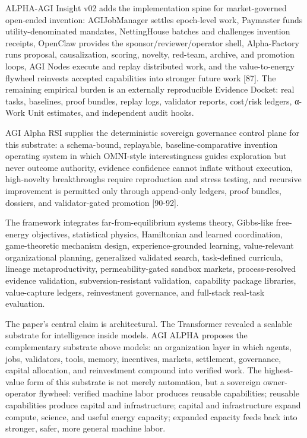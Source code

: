 ALPHA-AGI Insight v02 adds the implementation spine for market-governed
open-ended invention: AGIJobManager settles epoch-level work, Paymaster
funds utility-denominated mandates, NettingHouse batches and challenges
invention receipts, OpenClaw provides the sponsor/reviewer/operator
shell, Alpha-Factory runs proposal, causalization, scoring, novelty,
red-team, archive, and promotion loops, AGI Nodes execute and replay
distributed work, and the value-to-energy flywheel reinvests accepted
capabilities into stronger future work {[}87{]}. The remaining empirical
burden is an externally reproducible Evidence Docket: real tasks,
baselines, proof bundles, replay logs, validator reports, cost/risk
ledgers, α-Work Unit estimates, and independent audit hooks.

AGI Alpha RSI supplies the deterministic sovereign governance control
plane for this substrate: a schema-bound, replayable,
baseline-comparative invention operating system in which OMNI-style
interestingness guides exploration but never outcome authority, evidence
confidence cannot inflate without execution, high-novelty breakthroughs
require reproduction and stress testing, and recursive improvement is
permitted only through append-only ledgers, proof bundles, dossiers, and
validator-gated promotion {[}90-92{]}.

The framework integrates far-from-equilibrium systems theory, Gibbs-like
free-energy objectives, statistical physics, Hamiltonian and learned
coordination, game-theoretic mechanism design, experience-grounded
learning, value-relevant organizational planning, generalized validated
search, task-defined curricula, lineage metaproductivity,
permeability-gated sandbox markets, process-resolved evidence
validation, subversion-resistant validation, capability package
libraries, value-capture ledgers, reinvestment governance, and
full-stack real-task evaluation.

The paper's central claim is architectural. The Transformer revealed a
scalable substrate for intelligence inside models. AGI ALPHA proposes
the complementary substrate above models: an organization layer in which
agents, jobs, validators, tools, memory, incentives, markets,
settlement, governance, capital allocation, and reinvestment compound
into verified work. The highest-value form of this substrate is not
merely automation, but a sovereign owner-operator flywheel: verified
machine labor produces reusable capabilities; reusable capabilities
produce capital and infrastructure; capital and infrastructure expand
compute, science, and useful energy capacity; expanded capacity feeds
back into stronger, safer, more general machine labor.

